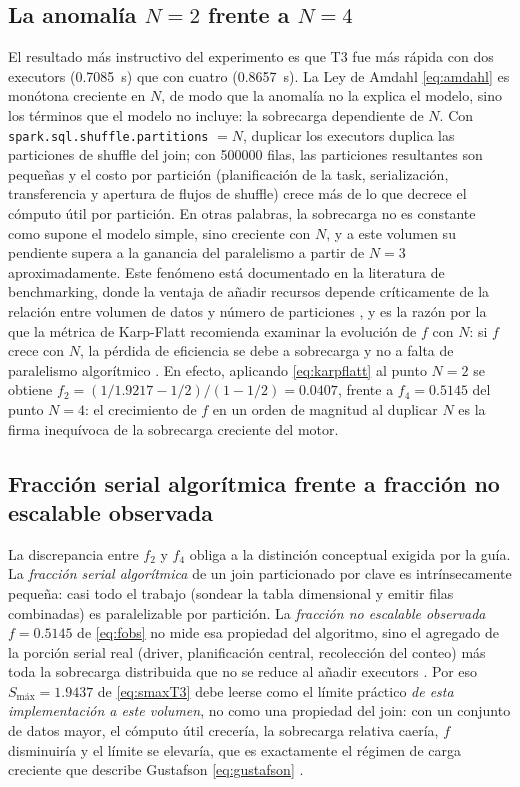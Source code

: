 \documentclass[10pt,journal]{IEEEtran}
\begin{document}
\subsection{La anomal\'ia $N=2$ frente a $N=4$}
El resultado m\'as instructivo del experimento es que T3 fue m\'as r\'apida con
dos executors (\SI{0.7085}{\second}) que con cuatro (\SI{0.8657}{\second}). La
Ley de Amdahl \eqref{eq:amdahl} es mon\'otona creciente en $N$, de modo que la
anomal\'ia no la explica el modelo, sino los t\'erminos que el modelo no
incluye: la sobrecarga dependiente de $N$. Con
\texttt{spark.sql.shuffle.partitions} $= N$, duplicar los executors duplica las
particiones de shuffle del join; con \num{500000} filas, las particiones
resultantes son peque\~nas y el costo por partici\'on (planificaci\'on de la
task, serializaci\'on, transferencia y apertura de flujos de shuffle) crece
m\'as de lo que decrece el c\'omputo \'util por partici\'on. En otras palabras,
la sobrecarga no es constante como supone el modelo simple, sino creciente con
$N$, y a este volumen su pendiente supera a la ganancia del paralelismo a
partir de $N = 3$ aproximadamente. Este fen\'omeno est\'a documentado en la
literatura de benchmarking, donde la ventaja de a\~nadir recursos depende
cr\'iticamente de la relaci\'on entre volumen de datos y n\'umero de
particiones \cite{ahmed2020}, y es la raz\'on por la que la m\'etrica de
Karp-Flatt recomienda examinar la evoluci\'on de $f$ con $N$: si $f$ crece con
$N$, la p\'erdida de eficiencia se debe a sobrecarga y no a falta de
paralelismo algor\'itmico \cite{karp1990}. En efecto, aplicando
\eqref{eq:karpflatt} al punto $N=2$ se obtiene
$f_2 = (1/\num{1.9217} - 1/2)/(1 - 1/2) = \num{0.0407}$, frente a
$f_4 = \num{0.5145}$ del punto $N=4$: el crecimiento de $f$ en un orden de
magnitud al duplicar $N$ es la firma inequ\'ivoca de la sobrecarga creciente
del motor.

\subsection{Fracci\'on serial algor\'itmica frente a fracci\'on no escalable observada}
La discrepancia entre $f_2$ y $f_4$ obliga a la distinci\'on conceptual exigida
por la gu\'ia. La \emph{fracci\'on serial algor\'itmica} de un join
particionado por clave es intr\'insecamente peque\~na: casi todo el trabajo
(sondear la tabla dimensional y emitir filas combinadas) es paralelizable por
partici\'on. La \emph{fracci\'on no escalable observada}
$f = \num{0.5145}$ de \eqref{eq:fobs} no mide esa propiedad del algoritmo, sino
el agregado de la porci\'on serial real (driver, planificaci\'on central,
recolecci\'on del conteo) m\'as toda la sobrecarga distribuida que no se reduce
al a\~nadir executors \cite{karp1990}. Por eso $S_{\text{m\'ax}} =
\num{1.9437}$ de \eqref{eq:smaxT3} debe leerse como el l\'imite pr\'actico
\emph{de esta implementaci\'on a este volumen}, no como una propiedad del join:
con un conjunto de datos mayor, el c\'omputo \'util crecer\'ia, la sobrecarga
relativa caer\'ia, $f$ disminuir\'ia y el l\'imite se elevar\'ia, que es
exactamente el r\'egimen de carga creciente que describe Gustafson
\eqref{eq:gustafson} \cite{gustafson1988}.
\end{document}
